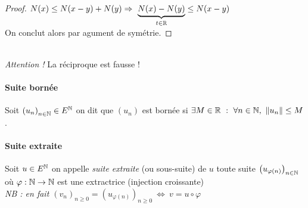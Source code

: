 		 \medskip


		\begin{proof}
			$N(x)\leq N(x-y) + N(y) \Rightarrow ~ \underbrace{N(x) - N(y)}_{t\in {\mathbb{R}}} \leq N(x-y)$\\
			On conclut alors par agument de symétrie.
		\end{proof} \medskip

			
		 \\
		{\small \emph{Attention !} La réciproque est fausse !}

		\newpage
		
		\traitd
		\paragraph{Suite bornée}
			Soit $\left(u_n\right)_{n\in{\mathbb{N}}} \in E^{{\mathbb{N}}}$ on dit que $\left(u_n\right)$ est bornée si
			$\exists M \in {\mathbb{R}} ~:~ \forall n\in{\mathbb{N}} ,~\left\Vert u_n \right\Vert\leq M$. 
		\trait

		 \medskip

		
		\traitd
		\paragraph{Suite extraite}
			Soit $u \in E^{{\mathbb{N}}}$ on appelle \emph{suite extraite} (ou sous-suite) de $u$ toute suite
			$\left(u_{\varphi (n)}\right)_{n\in {\mathbb{N}}}$ où $\varphi : {\mathbb{N}} \rightarrow {\mathbb{N}}$ 
			est une extractrice (injection croissante) \\ \textit{\small NB : en fait $\left(v_n\right)_{n\geq0} = 
			\left(u_{\varphi (n)} \right)_{n\geq 0} ~\Leftrightarrow ~v= u\circ\varphi$} 
		\traitdouble
